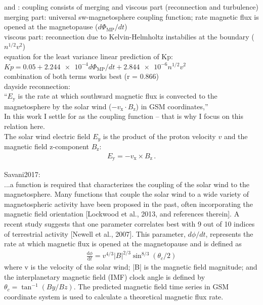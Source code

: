 \citet{Newell2007} and \citet{Newell2008}: coupling consists of merging and viscous part (reconnection and turbulence)\\
merging part: universal sw-magnetosphere coupling function; rate magnetic flux is opened at the magnetopause ($d\Phi_\text{MP}/dt$)\\
viscous part: reconnection due to Kelvin-Helmholtz instabilies at the boundary ($n^{1/2} v^2$)\\
equation for the least variance linear prediction of Kp: $Kp = 0.05 + \num{2.244e-4} d\Phi_\text{MP}/dt + \num{2.844e-6} n^{1/2} v^2$\\
combination of both terms works best (r = 0.866)\\

dayside reconnection:\\
``$E_\text{y}$ is the rate at which southward magnetic flux is convected to the magnetosphere by the solar wind ($-v_\text{x} \cdot B_\text{z}$) in GSM coordinates,'' \citep{Russell2007}\\

In this work I settle for \vBz{} as the coupling function -- that is why I focus on this relation here.\\

The solar wind electric field $E_y$ is the product of the proton velocity $v$ and the magnetic field z-component $B_\text{z}$:
\begin{align}
	E_\text{y} = -v_\text{x} \times B_\text{z}\,.	\label{eq:coupling_vxBz}
\end{align}

Savani2017:\\
...a function is required that characterizes the coupling of the solar wind to the magnetosphere. Many functions that couple the solar wind to a wide variety of magnetospheric activity have been proposed in the past, often incorporating the magnetic field orientation [Lockwood et al., 2013, and references therein]. A recent study suggests that one parameter correlates best with 9 out of 10 indices of terrestrial activity [Newell et al., 2007]. This parameter, $d\phi/dt$, represents the rate at which magnetic flux is opened at the magnetopause and is defined as\\
\begin{align}
	\frac{\text{d}\phi}{\text{d}t} = v^{4/3} |B|^{2/3} \sin^{8/3}(\theta_c/2)
\end{align}
where v is the velocity of the solar wind; |B| is the magnetic field magnitude; and the interplanetary magnetic field (IMF) clock angle is defined by $\theta_c = \tan^{-1}(By/Bz)$. The predicted magnetic field time series in GSM coordinate system is used to calculate a theoretical magnetic flux rate.\\


